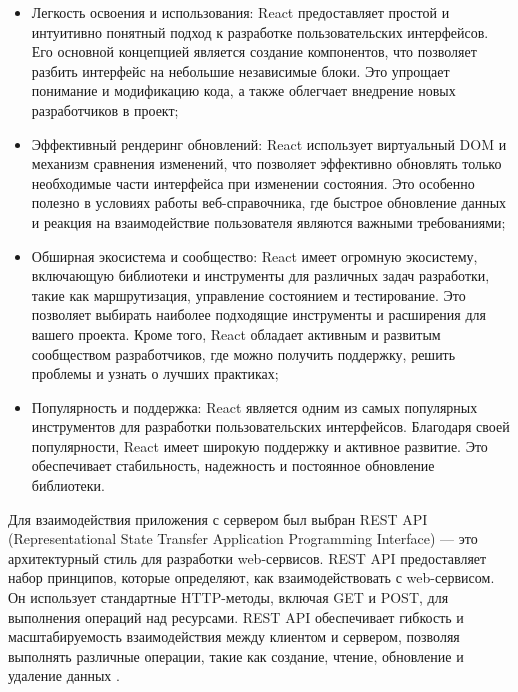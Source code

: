 \begin{itemize}
    \item Легкость освоения и использования: React предоставляет простой и интуитивно понятный подход к разработке пользовательских интерфейсов. Его основной концепцией является создание компонентов, что позволяет разбить интерфейс на небольшие независимые блоки. Это упрощает понимание и модификацию кода, а также облегчает внедрение новых разработчиков в проект;
    \item Эффективный рендеринг обновлений: React использует виртуальный DOM и механизм сравнения изменений, что позволяет эффективно обновлять только необходимые части интерфейса при изменении состояния. Это особенно полезно в условиях работы веб-справочника, где быстрое обновление данных и реакция на взаимодействие пользователя являются важными требованиями;
    \item Обширная экосистема и сообщество: React имеет огромную экосистему, включающую библиотеки и инструменты для различных задач разработки, такие как маршрутизация, управление состоянием и тестирование. Это позволяет выбирать наиболее подходящие инструменты и расширения для вашего проекта. Кроме того, React обладает активным и развитым сообществом разработчиков, где можно получить поддержку, решить проблемы и узнать о лучших практиках;
    \item Популярность и поддержка: React является одним из самых популярных инструментов для разработки пользовательских интерфейсов. Благодаря своей популярности, React имеет широкую поддержку и активное развитие. Это обеспечивает стабильность, надежность и постоянное обновление библиотеки.
\end{itemize}

Для взаимодействия приложения с сервером был выбран REST API (Representational State Transfer Application Programming Interface) — это архитектурный стиль для разработки web-сервисов. REST API предоставляет набор принципов, которые определяют, как взаимодействовать с web-сервисом. Он использует стандартные HTTP-методы, включая GET и POST, для выполнения операций над ресурсами. REST API обеспечивает гибкость и масштабируемость взаимодействия между клиентом и сервером, позволяя выполнять различные операции, такие как создание, чтение, обновление и удаление данных \cite{API}.

